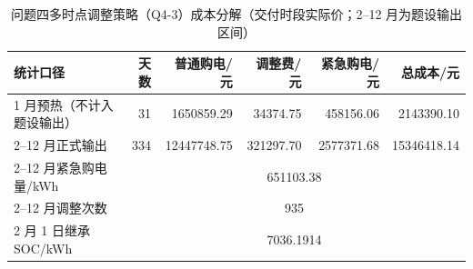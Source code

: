 \begin{table}[htbp]
\centering
\caption{问题四多时点调整策略（Q4-3）成本分解（交付时段实际价；2--12 月为题设输出区间）}\label{tab:q4-3-cost-summary}
\small\setlength{\tabcolsep}{3pt}
\begin{tabular}{@{}lrrrrr@{}}
\toprule
统计口径 & 天数 & 普通购电/元 & 调整费/元 & 紧急购电/元 & 总成本/元 \\
\midrule
1 月预热（不计入题设输出） & 31 & 1650859.29 & 34374.75 & 458156.06 & 2143390.10 \\
2--12 月正式输出 & 334 & 12447748.75 & 321297.70 & 2577371.68 & 15346418.14 \\
\midrule
2--12 月紧急购电量/kWh & \multicolumn{5}{c}{651103.38} \\
2--12 月调整次数 & \multicolumn{5}{c}{935} \\
2 月 1 日继承 SOC/kWh & \multicolumn{5}{c}{7036.1914} \\
\bottomrule
\end{tabular}
\end{table}
